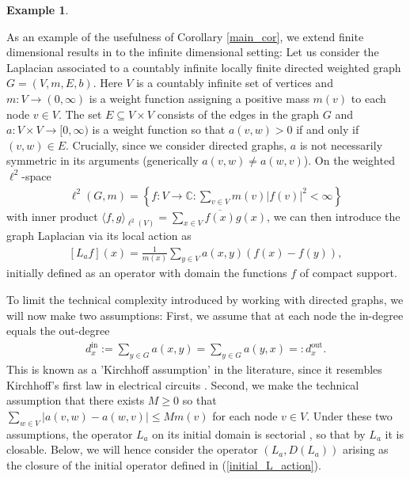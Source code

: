 \documentclass[reqno,12pt,letterpaper]{amsart}
\numberwithin{equation}{section}
\newcommand{\1}{\mathds{1}}
\theoremstyle{definition}
\newtheorem{Ex}[Th]{Example}
\begin{document}
\begin{Ex}\label{main_graph_example}

As an example of the usefulness of Corollary \ref{main_cor}, we extend finite dimensional results in \cite{koke2024holonets} to the infinite dimensional setting:
Let us consider the Laplacian associated to a countably infinite  locally finite directed weighted graph $G = (V, m, E, b)$. Here $V$ is a countably infinite set of vertices and $m: V \rightarrow (0, \infty)$ is a weight function assigning a positive mass $m(v)$ to each node $v \in V$. The set 
 $E \subseteq V \times V$ consists of the edges in the graph $G$ and $a: V \times V \rightarrow [0,\infty)$ is a weight function so that $a(v,w) > 0$ if and only if $(v,w) \in E$.
Crucially, since we consider directed graphs, $a$ is not necessarily symmetric in its arguments (generically $a(v,w) \neq a(w,v)$).
 On the weighted $\ell^2$-space
\begin{align}
	\ell^2(G,m) = \left\{ f: V \rightarrow \mathds{C}: \sum\limits_{v \in V} m(v) |f(v)|^2 < \infty      \right\}
\end{align}
with inner product $\langle f,g\rangle_{\ell^2(V)} = \sum_{x \in V} \overline{f(x)} g(x) $, we can then introduce the graph Laplacian  via its local action as
 \begin{align}\label{initial_L_action}
 	[L_af](x) = \frac{1}{m(x)} \sum\limits_{y \in V} a(x,y) (f(x) - f(y)),
 \end{align}
initially defined as an operator with domain the functions $f$ of compact support.

 To limit the technical complexity introduced by working with directed graphs, we will now make two assumptions: First, we assume that at each node the in-degree equals the out-degree
\begin{align}
	d^{\text{in}}_{x} :=	\sum\limits_{y \in G} a(x,y) = \sum\limits_{y \in G} a(y,x) =:   d^{\text{out}}_{x}.
\end{align} 
This is known as a  'Kirchhoff assumption' in the literature, since it resembles Kirchhoff's first law in electrical circuits \cite{anne2018sectoriality, balti2017,balti2017a, balti2017b}.
Second, we make the technical assumption that there exists $M \geq 0$ so that $\sum_{w \in V} |a(v,w) - a(w,v)| \leq M m(v) $ for each node $v \in V$. Under these two assumptions, the operator $L_a$ on its initial domain is sectorial \cite{anne2018sectoriality}, so that by \cite[Theorem V.3.4]{kato1995perturbation} $L_a$ it is closable. Below, we will hence consider the operator $(L_a, D(L_a))$ arising as the closure of the initial operator defined in (\ref{initial_L_action}).



\end{Ex}
\end{document}

